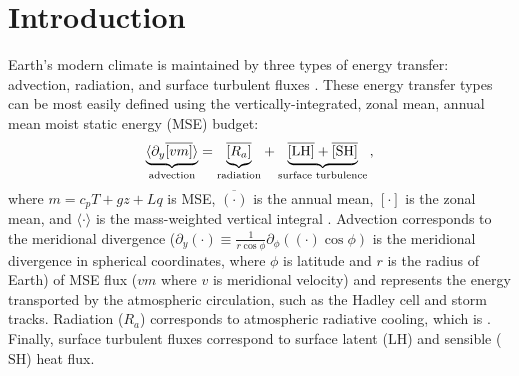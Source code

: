 \documentclass{ametsocV5}
\begin{document}




\section{Introduction}
Earth's modern climate is maintained by three types of energy transfer: advection, radiation, and surface turbulent fluxes \citep[e.g., see Ch.~6.2 in][]{hartmann2016}. These energy transfer types can be most easily defined using the vertically-integrated, zonal mean, annual mean moist static energy (MSE) budget:
\begin{equation} \label{eq:mse-ann}
    {\underbrace{ \langle\partial_y \overline{[vm]}\rangle}_{\text{advection}}} = {\underbrace{\vphantom{\partial_y \langle [vm]\rangle} \overline{[R_{a}]}}_\text{radiation}} + {\underbrace{\vphantom{\partial_y \langle [vm]\rangle} \mathrm{\overline{[LH]}+\overline{[SH]}}}_\text{surface turbulence}} \, ,
\end{equation}
where $m=c_p T + gz + Lq$ is MSE, $\overline{(\cdot)}$ is the annual mean, $[\cdot]$ is the zonal mean, and $\langle \cdot \rangle$ is the mass-weighted vertical integral \citep{neelin1987}. Advection corresponds to the meridional divergence ($\partial_y(\cdot)\equiv \frac{1}{r\cos{\phi}}\partial_\phi\left((\cdot)\cos{\phi}\right)$ is the meridional divergence in spherical coordinates, where $\phi$ is latitude and $r$ is the radius of Earth) of MSE flux ($vm$ where $v$ is meridional velocity) and represents the energy transported by the atmospheric circulation, such as the Hadley cell and storm tracks. Radiation ($R_a$) corresponds to atmospheric radiative cooling, which is . Finally, surface turbulent fluxes correspond to surface latent ($\mathrm{LH}$) and sensible ($\mathrm{SH}$) heat flux.
\end{document}
